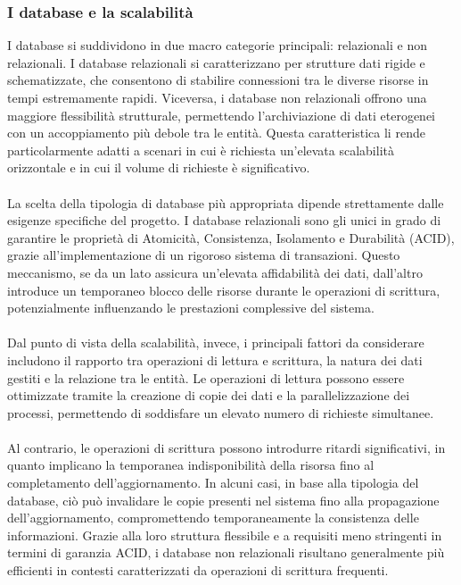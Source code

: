 \subsubsection{ I database e la scalabilità}

I database si suddividono in due macro categorie principali: relazionali e non relazionali. 
I database relazionali si caratterizzano per strutture dati rigide e schematizzate, che consentono di stabilire connessioni tra le diverse risorse in tempi estremamente rapidi. 
Viceversa, i database non relazionali offrono una maggiore flessibilità strutturale, permettendo l’archiviazione di dati eterogenei con un accoppiamento più debole tra le entità. 
Questa caratteristica li rende particolarmente adatti a scenari in cui è richiesta un'elevata scalabilità orizzontale e in cui il volume di richieste è significativo.\\
\\

La scelta della tipologia di database più appropriata dipende strettamente dalle esigenze specifiche del progetto. 
I database relazionali sono gli unici in grado di garantire le proprietà di Atomicità, Consistenza, Isolamento e Durabilità (ACID), 
grazie all’implementazione di un rigoroso sistema di transazioni. 
Questo meccanismo, se da un lato assicura un’elevata affidabilità dei dati, dall’altro introduce un temporaneo blocco delle risorse durante le operazioni di scrittura, 
potenzialmente influenzando le prestazioni complessive del sistema.\\
\\
Dal punto di vista della scalabilità, invece, i principali fattori da considerare includono il rapporto tra operazioni di lettura e scrittura, 
la natura dei dati gestiti e la relazione tra le entità. 
Le operazioni di lettura possono essere ottimizzate tramite la creazione di copie dei dati e la parallelizzazione dei processi, 
permettendo di soddisfare un elevato numero di richieste simultanee.\\
\\

Al contrario, le operazioni di scrittura possono introdurre ritardi significativi, in quanto implicano la temporanea indisponibilità della risorsa fino al completamento dell’aggiornamento. 
In alcuni casi, in base alla tipologia del database, ciò può invalidare le copie presenti nel sistema fino alla propagazione dell’aggiornamento, 
compromettendo temporaneamente la consistenza delle informazioni. 
Grazie alla loro struttura flessibile e a requisiti meno stringenti in termini di garanzia ACID, 
i database non relazionali risultano generalmente più efficienti in contesti caratterizzati da operazioni di scrittura frequenti.\\
\\

